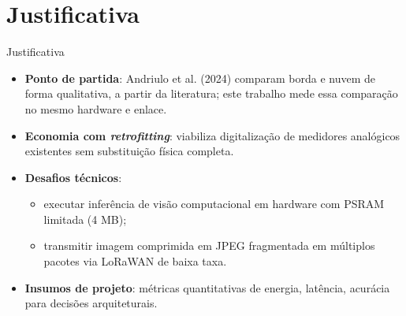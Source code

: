 \documentclass[
    aspectratio=169,
    11pt,
    brazil
]{beamer}
\begin{document}
\section{Justificativa}
\begin{frame}{Justificativa}
  \begin{itemize}\footnotesize
    \setlength{\itemsep}{4pt}
    \item \textbf{Ponto de partida}: Andriulo et al. (2024) comparam borda e nuvem de forma qualitativa, a partir da literatura; este trabalho mede essa comparação no mesmo hardware e enlace.
    \item \textbf{Economia com \textit{retrofitting}}: viabiliza digitalização de medidores analógicos existentes sem substituição física completa.
    \item \textbf{Desafios técnicos}:
      \begin{itemize}\scriptsize
        \item executar inferência de visão computacional em hardware com PSRAM limitada (4 MB);
        \item transmitir imagem comprimida em JPEG fragmentada em múltiplos pacotes via LoRaWAN de baixa taxa.
      \end{itemize}
    \item \textbf{Insumos de projeto}: métricas quantitativas de energia, latência, acurácia para decisões arquiteturais.
  \end{itemize}
\end{frame}

\end{document}

